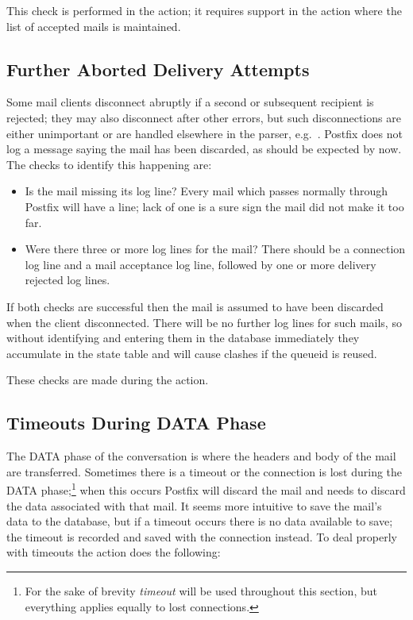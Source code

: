 This check is performed in the  action; it requires
support in the  action where the list of accepted mails is
maintained.


\subsection{Further Aborted Delivery Attempts}

Some mail clients disconnect abruptly if a second or subsequent recipient
is rejected; they may also disconnect after other errors, but such
disconnections are either unimportant or are handled elsewhere in the
parser, e.g.\ .  Postfix does not
log a message saying the mail has been discarded, as should be expected by
now.  The checks to identify this happening are:

\begin{itemize}

    \item Is the mail missing its  log line?  Every mail
        which passes normally through Postfix will have a 
        line; lack of one is a sure sign the mail did not make it too far.

    \item Were there three or more  log lines for the mail?
        There should be a connection log line and a mail acceptance log
        line, followed by one or more delivery rejected log lines.

\end{itemize}

If both checks are successful then the mail is assumed to have been
discarded when the client disconnected.  There will be no further log lines
for such mails, so without identifying and entering them in the database
immediately they accumulate in the state table and will cause clashes if
the queueid is reused.

These checks are made during the  action.

\subsection{Timeouts During DATA Phase}

\label{timeouts during data phase}

The DATA phase of the  conversation is where the headers and
body of the mail are transferred.  Sometimes there is a timeout or the
connection is lost during the DATA phase;\footnote{For the sake of brevity
\textit{timeout\/} will be used throughout this section, but everything
applies equally to lost connections.} when this occurs Postfix will discard
the mail and \parsername{} needs to discard the data associated with that
mail.  It seems more intuitive to save the mail's data to the database, but
if a timeout occurs there is no data available to save; the timeout is
recorded and saved with the connection instead.  To deal properly with
timeouts the  action does the following:

